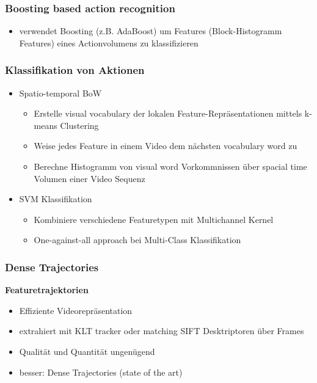 \documentclass[paper=a4, fontsize=11pt]{scrartcl} %
\numberwithin{equation}{section} %
\numberwithin{figure}{section} %
\numberwithin{table}{section} %
\begin{document}
\subsubsection{Boosting based action recognition}

\begin{itemize}
\item verwendet Boosting (z.B. AdaBoost) um Features (Block-Histogramm Features) eines Actionvolumens zu klassifizieren
\end{itemize}

\subsubsection{Klassifikation von Aktionen}

\begin{itemize}
\item Spatio-temporal BoW
\begin{itemize}
\item Erstelle visual vocabulary der lokalen Feature-Repräsentationen mittels k-means Clustering
\item Weise jedes Feature in einem Video dem nächsten vocabulary word zu
\item Berechne Histogramm von visual word Vorkommnissen über spacial time Volumen einer Video Sequenz
\end{itemize}
\item SVM Klassifikation
\begin{itemize}
\item Kombiniere verschiedene Featuretypen mit Multichannel Kernel
\item One-against-all approach bei Multi-Class Klassifikation
\end{itemize}
\end{itemize}

\subsubsection{Dense Trajectories}

\textbf{Featuretrajektorien}

\begin{itemize}
\item Effiziente Videorepräsentation
\item extrahiert mit KLT tracker oder matching SIFT Desktriptoren über Frames
\item Qualität und Quantität ungenügend
\item besser: Dense Trajectories (state of the art)
\end{itemize}
\end{document}
